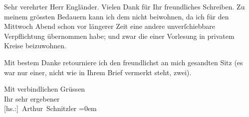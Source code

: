 \pstart\center{}Sehr verehrter Herr Engländer.\pend\vspace{0.5em}
\pstart
           Vielen Dank für Ihr freundliches Schreiben. Zu meinem grössten Bedauern kann ich dem
                  \label{K_L02322-1v}\label{K_L02322-1} nicht beiwohnen, da ich für den Mittwoch{ }Abend schon vor längerer Zeit eine andere \introOben{}unverſchiebbare\introOben{} Verpflichtung übernommen habe\introOben{};\introOben{}
               und zwar die einer Vorlesung in privatem Kreise beizuwohnen.\pend
           
\pstart
           {\pb}Mit bestem Danke retourniere ich den freundlichst
               an mich gesandten Sitz (es war nur einer, nicht wie in Ihrem Brief vermerkt steht,
               zwei).\pend
           
\pstart
           Mit verbindlichen Grüssen{\\[\baselineskip]}Ihr sehr ergebener{\\[\baselineskip]}\spacefill\mbox{{[}hs.:{]} Arthur Schnitzler}\pend
           \leftskip=0em{}\endnumbering{}  \newcommand{\dateiname}{L02322}\newcommand{\titel}{Arthur Schnitzler an Georg Engländer, 3. 3. 1919}\newcommand{\editorInnen}{Martin Anton Müller und Gerd-Hermann Susen}
